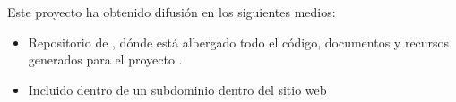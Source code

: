
Este proyecto ha obtenido difusión en los siguientes medios:

\begin{itemize}
\item Repositorio de , dónde está albergado todo el código,
  documentos y recursos generados para el proyecto \cite{cod:pfc_sfo}.
\item Incluido dentro de un subdominio dentro del sitio web  \cite{prog:pfc_sfo}
\end{itemize}